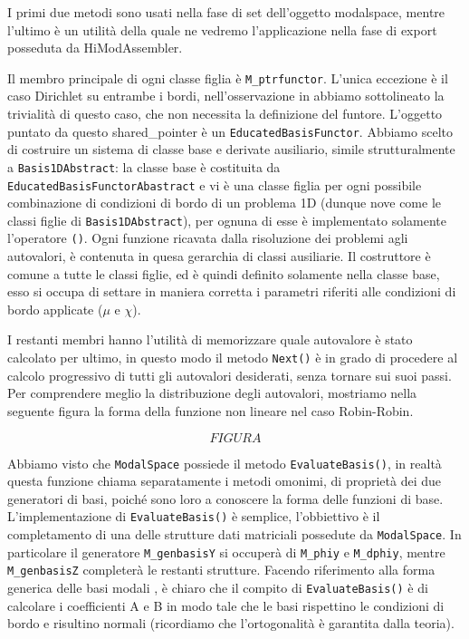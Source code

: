 I primi due metodi sono usati nella fase di set dell'oggetto modalspace, mentre l'ultimo \`e un utilit\`a della quale ne vedremo l'applicazione nella fase di export posseduta da HiModAssembler. 

Il membro principale di ogni classe figlia \`e \texttt{M\_ptrfunctor}. 
L'unica eccezione \`e il caso Dirichlet su entrambe i bordi, nell'osservazione in  abbiamo sottolineato la trivialit\`a di questo caso, che non necessita la definizione del funtore.
L'oggetto puntato da questo shared\_pointer  \`e un \texttt{EducatedBasisFunctor}. Abbiamo scelto di costruire un sistema di classe base e derivate ausiliario, simile strutturalmente a \texttt{Basis1DAbstract}: la classe base \`e costituita da \texttt{EducatedBasisFunctorAbastract} e vi \`e una classe figlia per ogni possibile combinazione di condizioni di bordo di un problema 1D (dunque nove come le classi figlie di \texttt{Basis1DAbstract}), per ognuna di esse \`e implementato solamente l'operatore \texttt{()}. Ogni funzione ricavata dalla risoluzione dei problemi agli autovalori, \`e contenuta in quesa gerarchia di classi ausiliarie. Il costruttore \`e comune a tutte le classi figlie, ed \`e quindi definito solamente nella classe base, esso si occupa di settare in maniera corretta i parametri riferiti alle condizioni di bordo applicate ($\mu$ e $\chi$). 


I restanti membri hanno l'utilit\`a di memorizzare quale autovalore \`e stato calcolato per ultimo, in questo modo il metodo \texttt{Next()} \`e in grado di procedere al calcolo progressivo di tutti gli autovalori desiderati, senza tornare sui suoi passi. Per comprendere meglio la distribuzione degli autovalori, mostriamo nella seguente figura la forma della funzione non lineare nel caso Robin-Robin.

\begin{equation}
FIGURA
\end{equation}

Abbiamo visto che \texttt{ModalSpace} possiede il metodo \texttt{EvaluateBasis()}, in realt\`a questa funzione chiama separatamente i metodi omonimi, di propriet\`a dei due generatori di basi, poich\'e sono loro a conoscere la forma delle funzioni di base. L'implementazione di \texttt{EvaluateBasis()} \`e semplice, l'obbiettivo \`e il completamento di una delle strutture dati matriciali possedute da \texttt{ModalSpace}. In particolare il generatore \texttt{M\_genbasisY} si occuper\`a di \texttt{M\_phiy} e \texttt{M\_dphiy}, mentre \texttt{M\_genbasisZ} completer\`a le restanti strutture.
Facendo riferimento alla forma generica delle basi modali , \`e chiaro che il compito di \texttt{EvaluateBasis()} \`e di calcolare i coefficienti A e B in modo tale che le basi rispettino le condizioni di bordo e risultino normali (ricordiamo che l'ortogonalit\`a \`e garantita dalla teoria).

